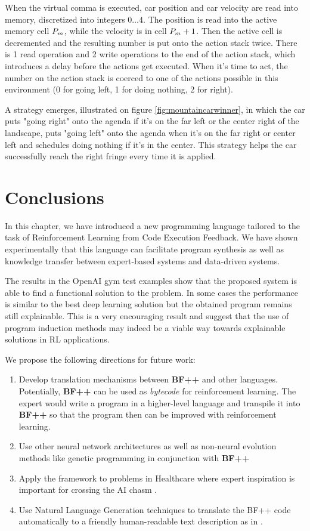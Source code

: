 When the virtual comma is executed, car position and car velocity are read into memory, discretized into integers $0\dots4$.
The position is read into the active memory cell $P_m$, while the velocity is in cell $P_m+1$.
Then the active cell is decremented and the resulting number is put onto the action stack twice.
There is 1 read operation and 2 write operations to the end of the action stack, which introduces a delay before the actions get executed.
When it's time to act, the number on the action stack is coerced to one of the actions possible in this environment (0 for going left, 1 for doing nothing, 2 for right). 

A strategy emerges, illustrated on figure \ref{fig:mountaincarwinner}, in which the car puts "going right" onto the agenda if it's on the far left or the center right of the landscape, puts "going left" onto the agenda when it's on the far right or center left and schedules doing nothing if it's in the center.
This strategy helps the car successfully reach the right fringe every time it is applied.

\newpage
\section{Conclusions}

In this chapter, we have introduced a new programming language tailored to the task of Reinforcement Learning from Code Execution Feedback.
We have shown experimentally that this language can facilitate program synthesis as well as knowledge transfer between expert-based systems and data-driven systems. 

The results in the OpenAI gym test examples show that the proposed system is able to find a functional solution to the problem. In some cases the performance is similar to the best deep learning solution but the obtained program remains still explainable. This is a very encouraging result and suggest that the use of program induction methods may indeed be a viable way towards explainable solutions in RL applications. 

We propose the following directions for future work:
\begin{enumerate}
    \item Develop translation mechanisms between \textbf{BF++} and other languages. Potentially, \textbf{BF++} can be used as \emph{bytecode} \cite{bytecode} for reinforcement learning. The expert would write a program in a higher-level language and transpile it into \textbf{BF++} so that the program then can be improved with reinforcement learning.
    \item Use other neural network architectures as well as non-neural evolution methods like genetic programming \cite{genprog1,genprog2} in conjunction with \textbf{BF++}
    \item Apply the framework to problems in Healthcare where expert inspiration is important for crossing the AI chasm \cite{aichasm}.    \item Use Natural Language Generation techniques to translate the BF++ code automatically to a friendly human-readable text description as in \cite{richardsonCode2TextChallengeText2017,code2nlg2}.
\end{enumerate}